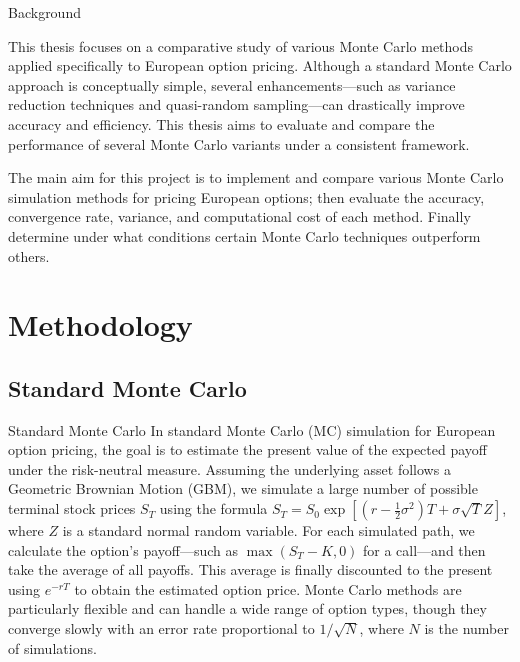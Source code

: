 \documentclass[aspectratio=169,xcolor=dvipsnames]{beamer}
\begin{document}
\begin{frame}{Background}
	
	This thesis focuses on a comparative study of various Monte Carlo methods applied specifically to European option pricing. Although a standard Monte Carlo approach is conceptually simple, several enhancements—such as variance reduction techniques and quasi-random sampling—can drastically improve accuracy and efficiency. This thesis aims to evaluate and compare the performance of several Monte Carlo variants under a consistent framework.
	
	The main aim for this project is to implement and compare various Monte Carlo simulation methods for pricing European options; then evaluate the accuracy, convergence rate, variance, and computational cost of each method. Finally determine under what conditions certain Monte Carlo techniques outperform others.
\end{frame}
	
	
	\section{Methodology}
	\subsection{Standard Monte Carlo}
	
	\begin{frame}{Standard Monte Carlo}
		In standard Monte Carlo (MC) simulation for European option pricing, the goal is to estimate the present value of the expected payoff under the risk-neutral measure. Assuming the underlying asset follows a Geometric Brownian Motion (GBM), we simulate a large number of possible terminal stock prices \( S_T \) using the formula \( S_T = S_0 \exp\left[(r - \frac{1}{2} \sigma^2) T + \sigma \sqrt{T} Z\right] \), where \( Z \) is a standard normal random variable. For each simulated path, we calculate the option’s payoff—such as \( \max(S_T - K, 0) \) for a call—and then take the average of all payoffs. This average is finally discounted to the present using \( e^{-rT} \) to obtain the estimated option price. Monte Carlo methods are particularly flexible and can handle a wide range of option types, though they converge slowly with an error rate proportional to \( 1/\sqrt{N} \), where \( N \) is the number of simulations.
	\end{frame}
\end{document}
